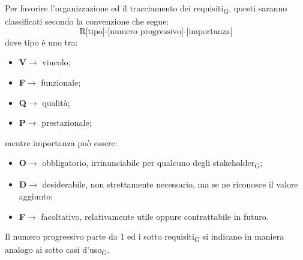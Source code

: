                 Per favorire l'organizzazione ed il tracciamento dei requisiti\textsubscript{G}, questi saranno classificati secondo la convenzione che segue:
                $$\text{R[tipo]-[numero progressivo]-[importanza]}$$
                dove tipo è uno tra:
                \begin{itemize}
                    \item \textbf{V}$\rightarrow$ vincolo;
                    \item \textbf{F}$\rightarrow$ funzionale;
                    \item \textbf{Q}$\rightarrow$ qualità;
                    \item \textbf{P}$\rightarrow$ prestazionale;
                \end{itemize}
                mentre importanza può essere:
                \begin{itemize}
                    \item \textbf{O}$\rightarrow$ obbligatorio, irrinunciabile per qualcuno degli stakeholder\textsubscript{G};
                    \item \textbf{D}$\rightarrow$ desiderabile, non strettamente necessario, ma se ne riconosce il valore aggiunto;
                    \item \textbf{F}$\rightarrow$ facoltativo, relativamente utile oppure contrattabile in futuro.
                \end{itemize}
                Il numero progressivo parte da 1 ed i sotto requisiti\textsubscript{G} si indicano in maniera analogo ai sotto casi d'uso\textsubscript{G}.

